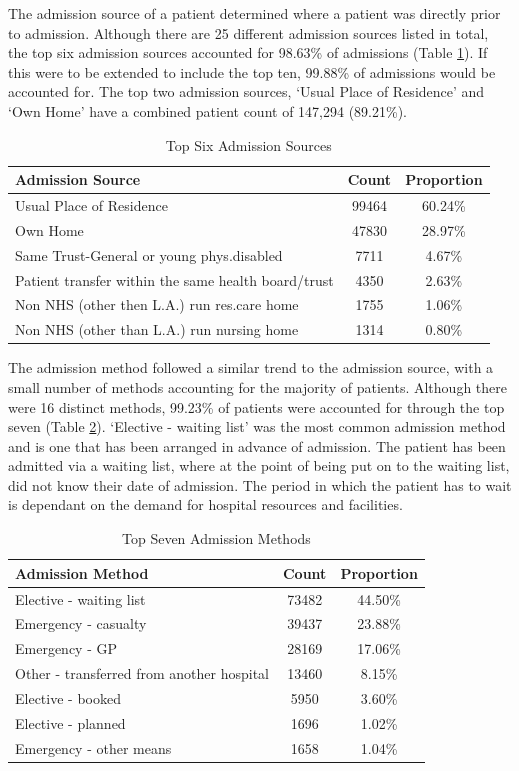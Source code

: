 \documentclass[../thesis.tex]{subfiles}
\begin{document}
The admission source of a patient determined where a patient was directly prior to admission. Although there are 25 different admission sources listed in total, the top six admission sources accounted for 98.63\% of admissions (Table \ref{tab:AdmissionSource}). If this were to be extended to include the top ten, 99.88\% of admissions would be accounted for. The top two admission sources, `Usual Place of Residence' and `Own Home' have a combined patient count of 147,294 (89.21\%).

\begin{table}[h!]
    \centering
    \begin{tabular}{lcc}\toprule
    \textbf{Admission Source} & \textbf{Count} &\textbf{Proportion} \\ \midrule
    Usual Place of Residence &	99464 & 60.24\% \\
Own Home&	47830 & 28.97\%\\
Same Trust-General or young phys.disabled&	7711 &4.67\%\\
Patient transfer within the same health board/trust	&4350 &2.63\%\\
Non NHS (other then L.A.) run res.care home&	1755 &1.06\%\\
Non NHS (other than L.A.) run nursing home&	1314 &0.80\%\\
 \bottomrule
    \end{tabular}
    \caption{Top Six Admission Sources}
    \label{tab:AdmissionSource}
\end{table}


The admission method followed a similar trend to the admission source, with a small number of methods accounting for the majority of patients. Although there were 16 distinct methods, 99.23\% of patients were accounted for through the top seven (Table \ref{tab:AdmissionMethod}). `Elective - waiting list' was the most common admission method and is one that has been arranged in advance of admission. The patient has been admitted via a waiting list, where at the point of being put on to the waiting list, did not know their date of admission. The period in which the patient has to wait is dependant on the demand for hospital resources and facilities.

\begin{table}[h!]
    \centering
    \begin{tabular}{lcc}\toprule
    \textbf{Admission Method} & \textbf{Count} &\textbf{Proportion} \\ \midrule
Elective - waiting list& 73482 & 44.50\%\\
Emergency - casualty&	39437 &23.88\%\\
Emergency - GP&  	28169&17.06\%\\
Other - transferred from another hospital  & 	13460&8.15\%\\
Elective - booked  &5950 & 3.60\%\\
Elective - planned&1696 & 1.02\%\\
Emergency - other means&1658 & 1.04\%\\
 \bottomrule
    \end{tabular}
    \caption{Top Seven Admission Methods}
    \label{tab:AdmissionMethod}
\end{table}
\end{document}
